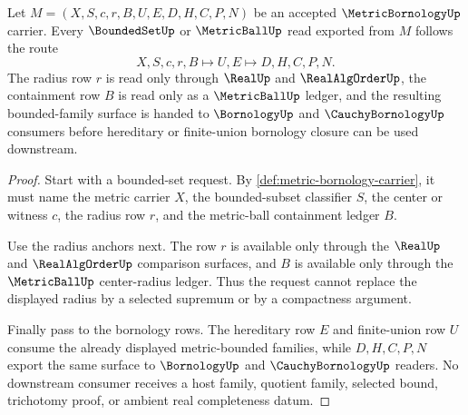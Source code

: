 \begin{theorem}
\label{thm:metric-bornology-bounded-set-radius-handoff}
Let $M=(X,S,c,r,B,U,E,D,H,C,P,N)$ be an accepted $\MetricBornologyUp$ carrier. Every $\BoundedSetUp$ or $\MetricBallUp$ read exported from $M$ follows the route
$$
X,S,c,r,B \longmapsto U,E \longmapsto D,H,C,P,N .
$$
The radius row $r$ is read only through $\RealUp$ and $\RealAlgOrderUp$, the containment row $B$ is read only as a $\MetricBallUp$ ledger, and the resulting bounded-family surface is handed to $\BornologyUp$ and $\CauchyBornologyUp$ consumers before hereditary or finite-union bornology closure can be used downstream.
\end{theorem}
\begin{proof}
Start with a bounded-set request. By \autoref{def:metric-bornology-carrier}, it must name the metric carrier $X$, the bounded-subset classifier $S$, the center or witness $c$, the radius row $r$, and the metric-ball containment ledger $B$.

Use the radius anchors next. The row $r$ is available only through the $\RealUp$ and $\RealAlgOrderUp$ comparison surfaces, and $B$ is available only through the $\MetricBallUp$ center-radius ledger. Thus the request cannot replace the displayed radius by a selected supremum or by a compactness argument.

Finally pass to the bornology rows. The hereditary row $E$ and finite-union row $U$ consume the already displayed metric-bounded families, while $D,H,C,P,N$ export the same surface to $\BornologyUp$ and $\CauchyBornologyUp$ readers. No downstream consumer receives a host family, quotient family, selected bound, trichotomy proof, or ambient real completeness datum.
\end{proof}



